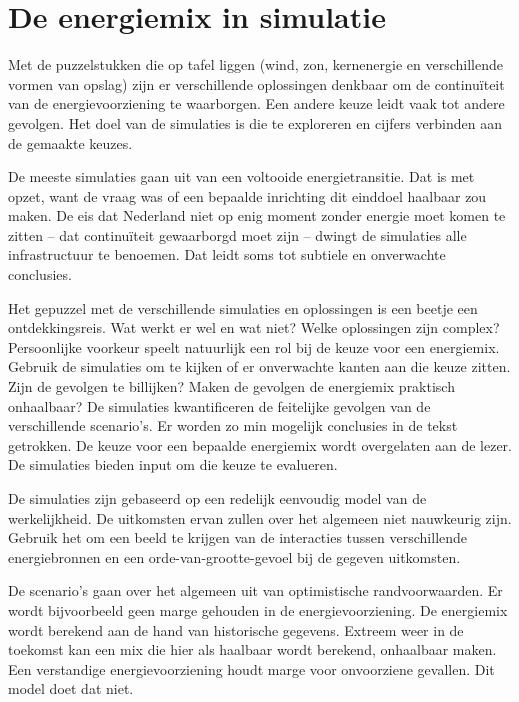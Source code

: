 \documentclass[
  11pt,
  a4paper,
]{book}
\begin{document}
\newpage

\hypertarget{de-energiemix-in-simulatie}{%
\section{De energiemix in simulatie}\label{de-energiemix-in-simulatie}}

Met de puzzelstukken die op tafel liggen (wind, zon, kernenergie en verschillende vormen van opslag) zijn er verschillende oplossingen denkbaar om de continuïteit van de energievoorziening te waarborgen. Een andere keuze leidt vaak tot andere gevolgen. Het doel van de simulaties is die te exploreren en cijfers verbinden aan de gemaakte keuzes.

De meeste simulaties gaan uit van een voltooide energietransitie. Dat is met opzet, want de vraag was of een bepaalde inrichting dit einddoel haalbaar zou maken. De eis dat Nederland niet op enig moment zonder energie moet komen te zitten -- dat continuïteit gewaarborgd moet zijn -- dwingt de simulaties alle infrastructuur te benoemen. Dat leidt soms tot subtiele en onverwachte conclusies.

Het gepuzzel met de verschillende simulaties en oplossingen is een beetje een ontdekkingsreis. Wat werkt er wel en wat niet? Welke oplossingen zijn complex? Persoonlijke voorkeur speelt natuurlijk een rol bij de keuze voor een energiemix. Gebruik de simulaties om te kijken of er onverwachte kanten aan die keuze zitten. Zijn de gevolgen te billijken? Maken de gevolgen de energiemix praktisch onhaalbaar? De simulaties kwantificeren de feitelijke gevolgen van de verschillende scenario's. Er worden zo min mogelijk conclusies in de tekst getrokken. De keuze voor een bepaalde energiemix wordt overgelaten aan de lezer. De simulaties bieden input om die keuze te evalueren.

De simulaties zijn gebaseerd op een redelijk eenvoudig model van de werkelijkheid. De uitkomsten ervan zullen over het algemeen niet nauwkeurig zijn. Gebruik het om een beeld te krijgen van de interacties tussen verschillende energiebronnen en een orde-van-grootte-gevoel bij de gegeven uitkomsten.

De scenario's gaan over het algemeen uit van optimistische randvoorwaarden. Er wordt bijvoorbeeld geen marge gehouden in de energievoorziening. De energiemix wordt berekend aan de hand van historische gegevens. Extreem weer in de toekomst kan een mix die hier als haalbaar wordt berekend, onhaalbaar maken. Een verstandige energievoorziening houdt marge voor onvoorziene gevallen. Dit model doet dat niet.
\end{document}
